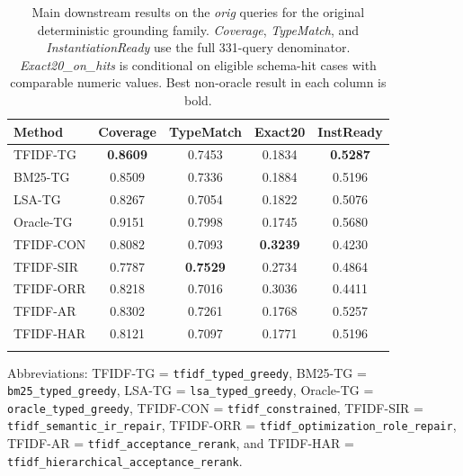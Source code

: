 \documentclass[pdflatex,sn-basic,Numbered]{sn-jnl}
\begin{document}
\begin{table}[t]
  \centering
  \caption{Main downstream results on the \emph{orig} queries for the original deterministic grounding family. \textit{Coverage}, \textit{TypeMatch}, and \textit{InstantiationReady} use the full 331-query denominator. \textit{Exact20\_on\_hits} is conditional on eligible schema-hit cases with comparable numeric values. Best non-oracle result in each column is bold.}
  \label{tab:nlp4lp-downstream-main}
  \small
  \setlength{\tabcolsep}{3.8pt}
  \begin{tabular}{lcccc}
    \toprule
    Method & Coverage & TypeMatch & Exact20 & InstReady \\
    \midrule
    TFIDF-TG  & \textbf{0.8609} & 0.7453 & 0.1834 & \textbf{0.5287} \\
    BM25-TG   & 0.8509 & 0.7336 & 0.1884 & 0.5196 \\
    LSA-TG    & 0.8267 & 0.7054 & 0.1822 & 0.5076 \\
    Oracle-TG & 0.9151 & 0.7998 & 0.1745 & 0.5680 \\
    TFIDF-CON & 0.8082 & 0.7093 & \textbf{0.3239} & 0.4230 \\
    TFIDF-SIR & 0.7787 & \textbf{0.7529} & 0.2734 & 0.4864 \\
    TFIDF-ORR & 0.8218 & 0.7016 & 0.3036 & 0.4411 \\
    TFIDF-AR  & 0.8302 & 0.7261 & 0.1768 & 0.5257 \\
    TFIDF-HAR & 0.8121 & 0.7097 & 0.1771 & 0.5196 \\
    \botrule
  \end{tabular}

  \vspace{2mm}
  \raggedright
  \footnotesize
  Abbreviations: TFIDF-TG = \texttt{tfidf\_typed\_greedy}, BM25-TG = \texttt{bm25\_typed\_greedy}, LSA-TG = \texttt{lsa\_typed\_greedy}, Oracle-TG = \texttt{oracle\_typed\_greedy}, TFIDF-CON = \texttt{tfidf\_constrained}, TFIDF-SIR = \texttt{tfidf\_semantic\_ir\_repair}, TFIDF-ORR = \texttt{tfidf\_optimization\_role\_repair}, TFIDF-AR = \texttt{tfidf\_acceptance\_rerank}, and TFIDF-HAR = \texttt{tfidf\_hierarchical\_acceptance\_rerank}.
\end{table}
\end{document}
